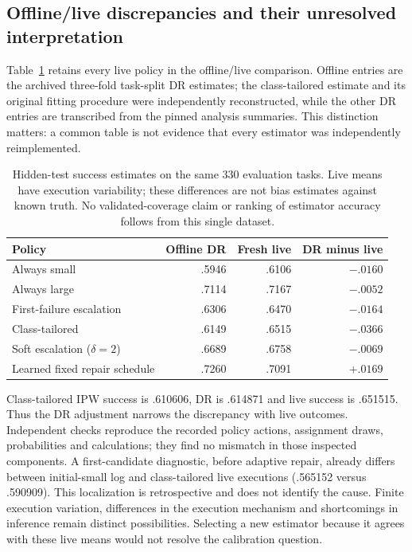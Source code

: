 \subsection{Offline/live discrepancies and their unresolved interpretation}
Table~\ref{tab:coding-calibration} retains every live policy in the offline/live comparison. Offline entries are
the archived three-fold task-split DR estimates; the class-tailored estimate and its original fitting procedure
were independently reconstructed, while the other DR entries are transcribed from the pinned analysis summaries.
This distinction matters: a common table is not evidence that every estimator was independently reimplemented.

\begin{table}[htbp]
\centering
\small
\begin{tabular}{lrrr}
\toprule
Policy & Offline DR & Fresh live & DR minus live \\
\midrule
Always small & .5946 & .6106 & $-.0160$ \\
Always large & .7114 & .7167 & $-.0052$ \\
First-failure escalation & .6306 & .6470 & $-.0164$ \\
Class-tailored & .6149 & .6515 & $-.0366$ \\
Soft escalation ($\delta=2$) & .6689 & .6758 & $-.0069$ \\
Learned fixed repair schedule & .7260 & .7091 & $+.0169$ \\
\bottomrule
\end{tabular}
\caption{Hidden-test success estimates on the same 330 evaluation tasks. Live means have execution variability;
these differences are not bias estimates against known truth. No validated-coverage claim or ranking of estimator
accuracy follows from this single dataset.}
\label{tab:coding-calibration}
\end{table}

Class-tailored IPW success is .610606, DR is .614871 and live success is .651515. Thus the DR adjustment narrows
the discrepancy with live outcomes. Independent checks reproduce the recorded policy actions, assignment draws,
probabilities and calculations; they find no mismatch in those inspected components. A first-candidate diagnostic,
before adaptive repair, already differs between initial-small log and class-tailored live executions (.565152
versus .590909). This localization is retrospective and does not identify the cause. Finite execution variation,
differences in the execution mechanism and shortcomings in inference remain distinct possibilities. Selecting a
new estimator because it agrees with these live means would not resolve the calibration question.

